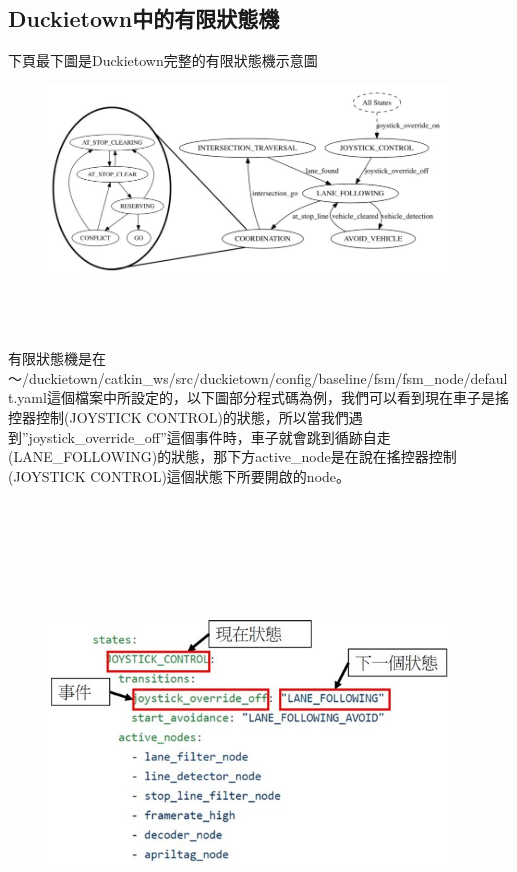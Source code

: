 \documentclass{article}
\begin{document}
\subsection{Duckietown中的有限狀態機}

下頁最下圖是Duckietown完整的有限狀態機示意圖
\\
\begin{figure}[htp]
    \begin{center}
        \includegraphics[width=300pt]{pic/圖片26.jpg}
    \end{center}
\end{figure}
\\\\\\
有限狀態機是在～/duckietown/catkin\_ws/src/duckietown/config/baseline/fsm/fsm\_node/default.yaml這個檔案中所設定的，以下圖部分程式碼為例，我們可以看到現在車子是搖控器控制(JOYSTICK CONTROL)的狀態，所以當我們遇到”joystick\_override\_off”這個事件時，車子就會跳到循跡自走(LANE\_FOLLOWING)的狀態，那下方active\_node是在說在搖控器控制(JOYSTICK CONTROL)這個狀態下所要開啟的node。
\\\\\\\\\\\\\\
\begin{figure}[htp]
    \begin{center}
        \includegraphics[width=300pt]{pic/圖片27.jpg}
    \end{center}
\end{figure}
\\
\end{document}
